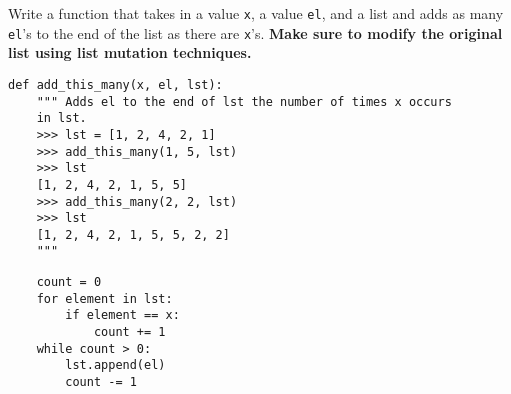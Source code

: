 \question Write a function that takes in a value \texttt{x}, a value
\texttt{el}, and a list and adds as many \texttt{el}'s to the end of the
list as there are \texttt{x}'s. \textbf{Make sure to modify the original
list using list mutation techniques.}

\begin{lstlisting}
def add_this_many(x, el, lst):
    """ Adds el to the end of lst the number of times x occurs
    in lst.
    >>> lst = [1, 2, 4, 2, 1]
    >>> add_this_many(1, 5, lst)
    >>> lst
    [1, 2, 4, 2, 1, 5, 5]
    >>> add_this_many(2, 2, lst)
    >>> lst
    [1, 2, 4, 2, 1, 5, 5, 2, 2]
    """
\end{lstlisting}
\begin{solution}[1.5in]
\begin{lstlisting}
    count = 0
    for element in lst:
        if element == x:
            count += 1
    while count > 0:
        lst.append(el)
        count -= 1
\end{lstlisting}
\end{solution}
